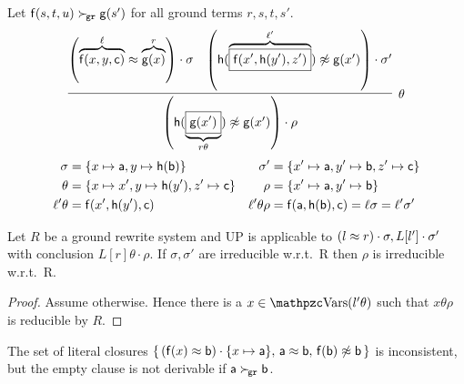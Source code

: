    \begin{example}
        Let \( \mathsf{f}(s,t,u)\mathrel\succ_{\!\mathtt{gr}}\mathsf{g}(s') \) for all ground terms
       \( r,s,t,s' \).
       \begin{gather*}
           \infer[\theta]{
               \left(
                   \mh(\underbrace{
                       \boxed{\mg(x')}
                        }_{r\theta})\mNE\mg(x')
                   \right)\cdot\rho
            }{
               \left(
                   \overbrace{\mf(x,y,\mc)}^{\ell}
                   \mEQ
                   \overbrace{\mg(x)}^r
               \right)\cdot \sigma
            & \left(
               \mh(\overbrace{
                   \boxed{\mf(x',\mh(y'), z')}
                    }^{\ell'})\mNE\mg(x')
               \right)\cdot \sigma'
            }
       \end{gather*}
       \begin{align*}
           \sigma &= \{x\mapsto\mathsf{a}, y\mapsto\mathsf{h}(\mathsf{b})\} &
            \sigma' &= \{x'\mapsto\mathsf{a}, y'\mapsto\mathsf{b}, z'\mapsto\mathsf{c} \}
            \\
            \theta &= \{x\mapsto x',y\mapsto\mathsf{h}(y'),z'\mapsto\mathsf{c} \}
              &
            \rho &=\{ x'\mapsto \mathsf{a}, y'\mapsto \mathsf{b} \}
            \\
            \ell'\theta &= \mathsf{f}(x',\mathsf{h}(y'),\mathsf{c})
             &
            \ell'\theta\rho &= \mathsf{f}(\mathsf{a}, \mathsf{h}(\mathsf{b}), \mathsf{c}) = \ell\sigma = \ell'\sigma'
       \end{align*}
   \end{example}

   \begin{lemma}
        Let \( R \) be a ground rewrite system and UP is applicable to
       \( (l\approx r)\cdot\sigma, L[l']\cdot\sigma' \)
        with conclusion
       \( L[r]\theta\cdot\rho \).
        If \( \sigma,\sigma' \) are irreducible w.r.t.~R then \( \rho \) is irreducible w.r.t.~R.
   \end{lemma}

   \begin{proof}
        Assume otherwise.
        Hence there is a \(
            x\in\var(l'\theta)
        \) such that
       \( x\theta\rho \) is reducible by \(
            R
            \).

   \end{proof}

           \begin{example}
        The set of literal closures
       \( \{ \,
        (\mathsf{f}(x)\approx\mathsf{b})\cdot \{ x\mapsto\mathsf{a} \}, \,
       \mathsf{a}\approx \mathsf{b}, \,
       \mathsf{f}(\mathsf{b})\not\approx\mathsf{b} \,
       \} \) is inconsistent,
        but the empty clause is not derivable
        if \( \mathsf{a}\mathrel\succ_{\!\mathtt{gr}}\mathsf{b} \).
           \end{example}






